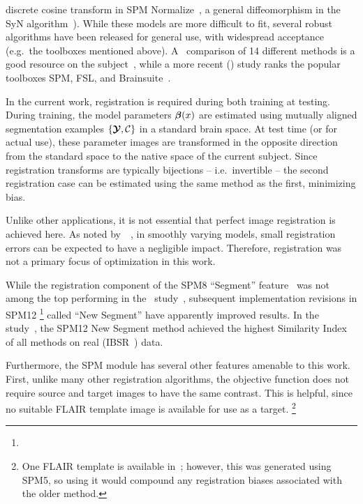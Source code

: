 discrete cosine transform in SPM Normalize~\cite{Ashburner1997,Ashburner2005},
a general diffeomorphism in the SyN algorithm~\cite{Avants2008}).
While these models are more difficult to fit,
several robust algorithms have been released for general use,
with widespread acceptance (e.g.\ the toolboxes mentioned above).
A~\citeyear{Klein2009} comparison of 14 different methods
is a good resource on the subject~\cite{Klein2009},
while a more recent (\citeyear{Kazemi2014}) study
ranks the popular toolboxes SPM, FSL, and Brainsuite~\cite{Kazemi2014}.
\par
In the current work, registration is required during both training at testing.
During training, the model parameters $\bm{\beta}(x)$ are estimated using
mutually aligned segmentation examples $\{\bm{\mathcal{Y}},\mathcal{C}\}$ in a standard brain space.
At test time (or for actual use), these parameter images
are transformed in the opposite direction from the standard space
to the native space of the current subject.
Since registration transforms are typically bijections -- i.e.\ invertible --
the second registration case can be estimated using the same method as the first, minimizing bias.
\par
Unlike other applications, it is not essential that perfect image registration is achieved here.
As noted by~\citeauthor{Harmouche2015}~\cite{Harmouche2015}, in smoothly varying models,
small registration errors can be expected to have a negligible impact.
Therefore, registration was not a primary focus of optimization in this work.
\par
While the registration component of the SPM8 ``Segment'' feature~\cite{Ashburner2005}
was not among the top performing in the~\citeyear{Klein2009} study~\cite{Klein2009},
subsequent implementation revisions in SPM12%
\footnote{}
called ``New Segment'' have apparently improved results.
In the~\citeyear{Kazemi2014} study~\cite{Kazemi2014}, the SPM12 New Segment method
achieved the highest Similarity Index of all methods on real (IBSR~\cite{IBSR}) data.
\par
Furthermore, the SPM module has several other features amenable to this work.
First, unlike many other registration algorithms,
the objective function does not require source and target images to have the same contrast.
This is helpful, since no suitable FLAIR template image is available for use as a target.%
\footnote{One FLAIR template is available in~\cite{Winkler2012};
  however, this was generated using SPM5, so using it
  would compound any registration biases associated with the older method.}
